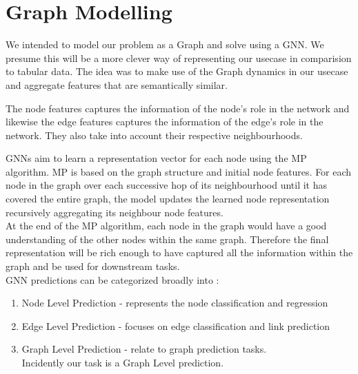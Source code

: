 \documentclass{report} %
\begin{document}

\newpage 

\chapter{Graph Modelling} 

We intended to model our problem as a Graph and solve using a \ac{GNN}. 
We presume this will be a more clever way of representing our usecase in comparision to tabular data.
The idea was to make use of the Graph dynamics in our usecase and aggregate features that are semantically similar.

The node features captures the information of the node's role in the network and likewise the edge features captures the information of the edge's role in the network.
They also take into account their respective neighbourhoods.

\ac{GNN}s aim to learn a representation vector for each node using the \ac{MP} algorithm.
\ac{MP} is based on the graph structure and initial node features.
For each node in the graph over each successive hop of its neighbourhood until it has covered the entire graph, the model updates the learned node representation recursively aggregating its neighbour node features.\\
At the end of the \ac{MP} algorithm, each node in the graph would have a good understanding of the other nodes within the same graph.
Therefore the final representation will be rich enough to have captured all the information within the graph and be used for downstream tasks.\\

\ac{GNN} predictions can be categorized broadly into : \cite{GNN-2019}
\begin{enumerate}
    \item Node Level Prediction - represents the node classification and regression
    \item Edge Level Prediction - focuses on edge classification and link prediction
    \item Graph Level Prediction - relate to graph prediction tasks.\\
    Incidently our task is a Graph Level prediction.
\end{enumerate}
\end{document}
